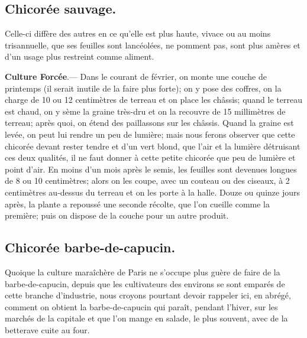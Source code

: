 \documentclass[10pt,a4paper]{book}
\begin{document}
\subsection{Chicorée sauvage.}

Celle-ci diffère des autres en ce qu'elle est plus haute, vivace ou au moins trisannuelle, que ses feuilles sont lancéolées, ne pomment pas, sont plus amères et d'un usage plus restreint comme aliment.

\textbf{Culture Forcée}.--- Dans le courant de février, on monte une couche de printemps (il serait inutile de la faire plus forte); on y pose des coffres, on la charge de 10 ou 12 centimètres de terreau et on place les châssis; quand le terreau est chaud, on y sème la graine très-dru et on la recouvre de 15 millimètres de terreau; après quoi, on étend des paillassons sur les châssis. Quand la graine est levée, on peut lui rendre un peu de lumière; mais nous ferons observer que cette chicorée devant rester tendre et d'un vert blond, que l'air et la lumière détruisant ces deux qualités, il ne faut donner à cette petite chicorée que peu de lumière et point d'air. En moins d'un mois après le semis, les feuilles sont devenues longues de 8 ou 10 centimètres; alors on les coupe, avec un couteau ou des ciseaux, à 2 centimètres au-dessus du terreau et on les porte à la halle. Douze ou quinze jours après, la plante a repoussé une seconde récolte, que l'on cueille comme la première; puis on dispose de la couche pour un autre produit.

\subsection{Chicorée barbe-de-capucin.}

Quoique la culture maraîchère de Paris ne s'occupe plus guère de faire de la barbe-de-capucin, depuis que les cultivateurs des environs se sont emparés de cette branche d'industrie, nous croyons pourtant devoir rappeler ici, en abrégé, comment on obtient la barbe-de-capucin qui paraît, pendant l'hiver, sur les marchés de la capitale et que l'on mange en salade, le plus souvent, avec de la betterave cuite au four.
\end{document}
